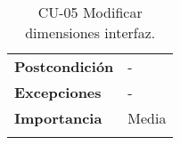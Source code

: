 \begin{longtable}[H]{@{}ll@{}}
\begin{minipage}[t]{0.23\columnwidth}
		\textbf{Postcondición}\strut
	\end{minipage} & \begin{minipage}[t]{0.71\columnwidth}\raggedright\strut
		-\strut
	\end{minipage}\tabularnewline
	\begin{minipage}[t]{0.23\columnwidth}\raggedright\strut
		\textbf{Excepciones}\strut
	\end{minipage} & \begin{minipage}[t]{0.71\columnwidth}\raggedright\strut
		-\strut
	\end{minipage}\tabularnewline
	\begin{minipage}[t]{0.23\columnwidth}\raggedright\strut
		\textbf{Importancia}\strut
	\end{minipage} & \begin{minipage}[t]{0.71\columnwidth}\raggedright\strut
		Media\strut
	\end{minipage}\tabularnewline
	\bottomrule
	\caption{CU-05 Modificar dimensiones interfaz.}
\end{longtable}
